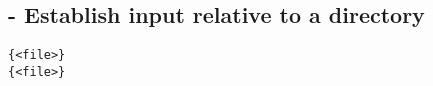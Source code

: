 
\subsection{ - Establish input relative to a directory}

\begin{listing}[H]
  \begin{verbatim}
{<file>}
{<file>}
  \end{verbatim}
  \caption{}
  \label{listing:import}
\end{listing}
